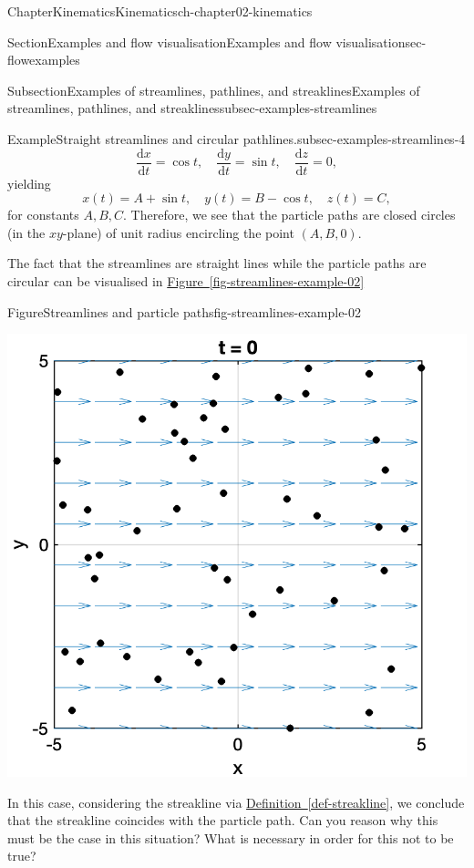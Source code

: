 \documentclass[oneside,10pt,]{book}
\newcommand{\xreffont}{\relax}
\numberwithin{equation}{section}
\newcommand{\de}{\mathrm{d}}
\newcommand{\dd}[2]{\frac{\de#1}{\de#2}}
\begin{document}
\begin{chapterptx}{Chapter}{Kinematics}{}{Kinematics}{}{}{ch-chapter02-kinematics}
\begin{sectionptx}{Section}{Examples and flow visualisation}{}{Examples and flow visualisation}{}{}{sec-flowexamples}
\begin{subsectionptx}{Subsection}{Examples of streamlines, pathlines, and streaklines}{}{Examples of streamlines, pathlines, and streaklines}{}{}{subsec-examples-streamlines}
\begin{example}{Example}{Straight streamlines and circular pathlines.}{subsec-examples-streamlines-4}
\begin{equation*}
\dd{x}{t} = \cos t, \quad \dd{y}{t} = \sin t, \quad \dd{z}{t} = 0,
\end{equation*}
yielding%
\begin{equation*}
x(t) = A + \sin t, \quad y(t) = B - \cos t, \quad z(t) = C, 
\end{equation*}
for constants \(A, B, C\). Therefore, we see that the particle paths are closed circles (in the \(xy\)-plane) of unit radius encircling the point \((A, B, 0)\).%
\par
The fact that the streamlines are straight lines while the particle paths are circular can be visualised in \hyperref[fig-streamlines-example-02]{Figure~{\xreffont\ref{fig-streamlines-example-02}}}%
\begin{figureptx}{Figure}{Streamlines and particle paths}{fig-streamlines-example-02}{}%
\begin{image}{0.25}{0.5}{0.25}{}%
\includegraphics[width=\linewidth]{external/streamlines_example02.png}
\end{image}%
\tcblower
\end{figureptx}%
In this case, considering the streakline via \hyperref[def-streakline]{Definition~{\xreffont\ref{def-streakline}}}, we conclude that the streakline coincides with the particle path. Can you reason why this must be the case in this situation? What is necessary in order for this not to be true?%

\end{example}
\end{subsectionptx}
\end{sectionptx}
\end{chapterptx}
\end{document}
